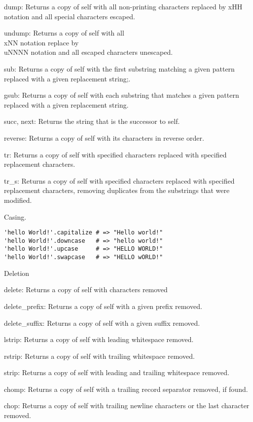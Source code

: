 dump: Returns a copy of self with all non-printing characters replaced by xHH notation and all special characters escaped.

undump: Returns a copy of self with all \\xNN notation replace by \\uNNNN notation and all escaped characters unescaped.

sub: Returns a copy of self with the first substring matching a given pattern replaced with a given replacement string;.

gsub: Returns a copy of self with each substring that matches a given pattern replaced with a given replacement string.

succ, next: Returns the string that is the successor to self.

reverse: Returns a copy of self with its characters in reverse order.

tr: Returns a copy of self with specified characters replaced with specified replacement characters.

tr\_s: Returns a copy of self with specified characters replaced with specified replacement characters, removing duplicates from the substrings that were modified.


Casing.
\begin{verbatim}
'hello World!'.capitalize # => "Hello world!"
'hello World!'.downcase   # => "hello world!"
'hello World!'.upcase     # => "HELLO WORLD!"
'hello World!'.swapcase   # => "HELLO wORLD!"
\end{verbatim}

Deletion

delete: Returns a copy of self with characters removed

delete\_prefix: Returns a copy of self with a given prefix removed.

delete\_suffix: Returns a copy of self with a given suffix removed.

lstrip: Returns a copy of self with leading whitespace removed.

rstrip: Returns a copy of self with trailing whitespace removed.

strip: Returns a copy of self with leading and trailing whitespace removed.

chomp: Returns a copy of self with a trailing record separator removed, if found.

chop: Returns a copy of self with trailing newline characters or the last character removed.

